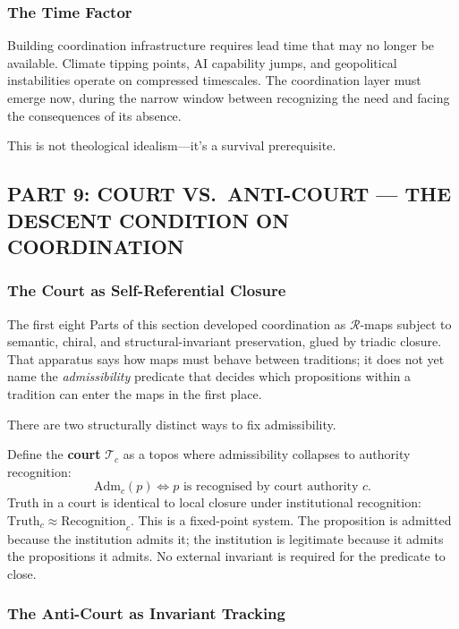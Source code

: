 \documentclass[
]{article}
\begin{document}
\subsubsection{The Time Factor}\label{the-time-factor}

Building coordination infrastructure requires lead time that may no
longer be available. Climate tipping points, AI capability jumps, and
geopolitical instabilities operate on compressed timescales. The
coordination layer must emerge now, during the narrow window between
recognizing the need and facing the consequences of its absence.

This is not theological idealism---it's a survival prerequisite.

\subsection{PART 9: COURT VS.\ ANTI-COURT --- THE DESCENT CONDITION
ON COORDINATION}\label{part-9-court-vs-anti-court}

\subsubsection{The Court as Self-Referential
Closure}\label{the-court-as-self-referential-closure}

The first eight Parts of this section developed coordination as
\(\mathcal{R}\)-maps subject to semantic, chiral, and structural-invariant
preservation, glued by triadic closure. That apparatus says how
maps must behave between traditions; it does not yet name the
\emph{admissibility} predicate that decides which propositions
within a tradition can enter the maps in the first place.

There are two structurally distinct ways to fix admissibility.

Define the \textbf{court} \(\mathcal{T}_c\) as a topos where
admissibility collapses to authority recognition:
\[
  \mathrm{Adm}_c(p) \iff p \text{ is recognised by court authority
  } c.
\]
Truth in a court is identical to local closure under institutional
recognition: \(\mathrm{Truth}_c \approx \mathrm{Recognition}_c\).
This is a fixed-point system. The proposition is admitted because
the institution admits it; the institution is legitimate because it
admits the propositions it admits. No external invariant is
required for the predicate to close.

\subsubsection{The Anti-Court as Invariant
Tracking}\label{the-anti-court-as-invariant-tracking}
\end{document}
